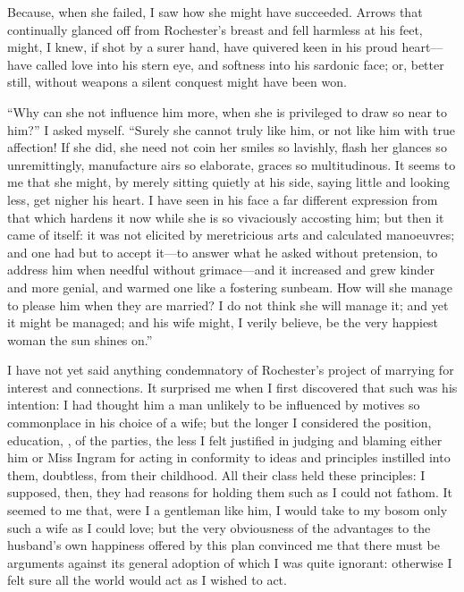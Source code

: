 Because, when she failed, I saw how she might have succeeded. Arrows
that continually glanced off from \Mr{} Rochester's breast and fell
harmless at his feet, might, I knew, if shot by a surer hand, have
quivered keen in his proud heart---have called love into his stern eye,
and softness into his sardonic face; or, better still, without weapons a
silent conquest might have been won.

\enquote{Why can she not influence him more, when she is privileged to
draw so near to him?} I asked myself. \enquote{Surely she cannot truly
like him, or not like him with true affection! If she did, she need not
coin her smiles so lavishly, flash her glances so unremittingly,
manufacture airs so elaborate, graces so multitudinous. It seems to me
that she might, by merely sitting quietly at his side, saying little and
looking less, get nigher his heart. I have seen in his face a far
different expression from that which hardens it now while she is so
vivaciously accosting him; but then it came of itself: it was not
elicited by meretricious arts and calculated manoeuvres; and one had but
to accept it---to answer what he asked without pretension, to address
him when needful without grimace---and it increased and grew kinder and
more genial, and warmed one like a fostering sunbeam. How will she
manage to please him when they are married? I do not think she will
manage it; and yet it might be managed; and his wife might, I verily
believe, be the very happiest woman the sun shines on.}

I have not yet said anything condemnatory of \Mr{} Rochester's project of
marrying for interest and connections. It surprised me when I first
discovered that such was his intention: I had thought him a man unlikely
to be influenced by motives so commonplace in his choice of a wife; but
the longer I considered the position, education, \etc, of the parties,
the less I felt justified in judging and blaming either him or Miss
Ingram for acting in conformity to ideas and principles instilled into
them, doubtless, from their childhood. All their class held these
principles: I supposed, then, they had reasons for holding them such as
I could not fathom. It seemed to me that, were I a gentleman like him,
I would take to my bosom only such a wife as I could love; but the very
obviousness of the advantages to the husband's own happiness offered by
this plan convinced me that there must be arguments against its general
adoption of which I was quite ignorant: otherwise I felt sure all the
world would act as I wished to act.


